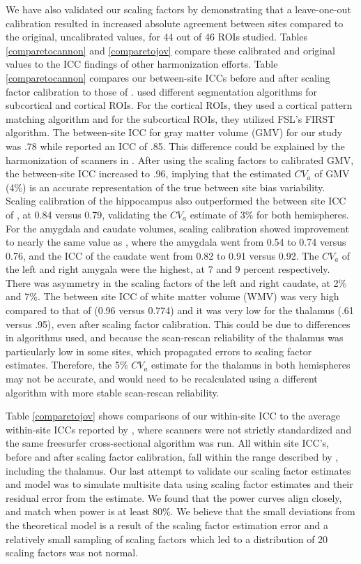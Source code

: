 We have also validated our scaling factors by demonstrating that a leave-one-out calibration resulted in increased absolute agreement between sites compared to the original, uncalibrated values, for 44 out of 46 ROIs studied. Tables \ref{comparetocannon} and \ref{comparetojov} compare these calibrated and original values to the ICC findings of other harmonization efforts. Table \ref{comparetocannon} compares our between-site ICCs before and after scaling factor calibration to those of \cite{cannon2014}. \cite{cannon2014} used different segmentation algorithms for subcortical and cortical ROIs. For the cortical ROIs, they used a cortical pattern matching algorithm \cite{thompson2001detecting} and for the subcortical ROIs, they utilized FSL's FIRST algorithm. The between-site ICC for gray matter volume (GMV) for our study was .78 while \cite{cannon2014} reported an ICC of .85. This difference could be explained by the harmonization of scanners in \cite{cannon2014}. After using the scaling factors to calibrated GMV, the between-site ICC increased to .96, implying that the estimated $CV_a$ of GMV (4\%) is an accurate representation of the true between site bias variability. Scaling calibration of the hippocampus also outperformed the between site ICC of \cite{cannon2014}, at 0.84 versus 0.79, validating the $CV_a$ estimate of 3\% for both hemispheres. For the amygdala and caudate volumes, scaling calibration showed improvement to nearly the same value as \cite{cannon2014}, where the amygdala went from 0.54 to 0.74 versus 0.76, and the ICC of the caudate went from 0.82 to 0.91 versus 0.92. The $CV_a$ of the left and right amygala were the highest, at 7 and 9 percent respectively. There was asymmetry in the scaling factors of the left and right caudate, at 2\% and 7\%. The between site ICC of white matter volume (WMV) was very high compared to that of \cite{cannon2014} (0.96 versus 0.774) and it was very low for the thalamus (.61 versus .95), even after scaling factor calibration. This could be due to differences in algorithms used, and because the scan-rescan reliability of the thalamus was particularly low in some sites, which propagated errors to scaling factor estimates. Therefore, the 5\% $CV_a$ estimate for the thalamus in both hemispheres may not be accurate, and would need to be recalculated using a different algorithm with more stable scan-rescan reliability. 

Table \ref{comparetojov} shows comparisons of our within-site ICC to the average within-site ICCs reported by \cite{jovicich2013brain}, where scanners were not strictly standardized and the same freesurfer cross-sectional algorithm was run. All within site ICC's, before and after scaling factor calibration, fall within the range described by \cite{jovicich2013brain}, including the thalamus. Our last attempt to validate our scaling factor estimates and model was to simulate multisite data using scaling factor estimates and their residual error from the estimate. We found that the power curves align closely, and match when power is at least 80\%. We believe that the small deviations from the theoretical model is a result of the scaling factor estimation error and a relatively small sampling of scaling factors which led to a distribution of 20 scaling factors was not normal.  